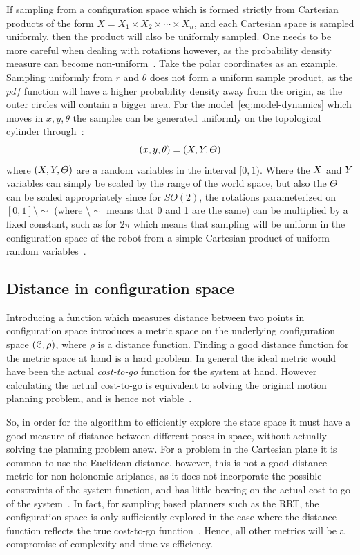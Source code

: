If sampling from a configuration space which is formed strictly from Cartesian
products of the form \(X = X_1\times X_2\times \cdots \times X_n\), and each
Cartesian space is sampled uniformly, then the product will also be uniformly
sampled. One needs to be more careful when dealing with rotations however, as
the probability density measure can become non-uniform~\cite{Lav06}. Take the
polar coordinates as an example. Sampling uniformly from \(r\) and \(\theta\)
does not form a uniform sample product, as the \(pdf\) function will have a
higher probability density away from the origin, as the outer circles will
contain a bigger area. For the model~\cref{eq:model-dynamics} which moves in
\(x,y,\theta\) the samples can be generated uniformly on the topological
cylinder through~\cite{kuffnerEffectiveSamplingDistance2004}:
\[
  (x,y,\theta) = (\mathnormal{X}, \mathnormal{Y}, \mathnormal{\Theta})
\]
where \((\mathnormal{X}, \mathnormal{Y}, \mathnormal{\Theta})\) are a random
variables in the interval \([0,1)\). Where the \(\mathnormal{X}\) and
\(\mathnormal{Y}\) variables can simply be scaled by the range of the world
space, but also the \(\mathnormal{\Theta}\) can be scaled appropriately since
for \(SO(2)\), the rotations parameterized on \([0,1]\setminus\sim\) (where
\(\setminus\sim\) means that 0 and 1 are the same) can be multiplied by a fixed
constant, such as for \(2\pi\) which means that sampling will be uniform in the
configuration space of the robot from a simple Cartesian product of uniform
random variables~\cite{Lav06}.

\subsection{Distance in configuration space}

Introducing a function which measures distance between two points in
configuration space introduces a metric space on the underlying configuration
space \((\mathcal{C}{},\rho)\), where \(\rho\) is a distance
function. Finding a good distance function for the metric space at hand is a
hard problem. In general the ideal metric would have been the actual
\textit{cost-to-go} function for the system at hand. However calculating the
actual cost-to-go is equivalent to solving the original motion planning problem,
and is hence not viable~\cite{pengchengReducingMetricSensitivity2001}.

So, in order for the \rrtfunnel{} algorithm to efficiently explore the state
space it must have a good measure of distance between different poses in space,
without actually solving the planning problem anew. For a problem in the
Cartesian plane it is common to use the Euclidean distance, however, this is not
a good distance metric for non-holonomic ariplanes, as it does not incorporate
the possible constraints of the system function, and has little bearing on the
actual cost-to-go of the system~\cite{parkFeedbackMotionPlanning2015}. In fact,
for sampling based planners such as the \ac{RRT}, the configuration space is
only sufficiently explored in the case where the distance function reflects the
true cost-to-go function~\cite{pengchengReducingMetricSensitivity2001}. Hence,
all other metrics will be a compromise of complexity and time vs efficiency.

